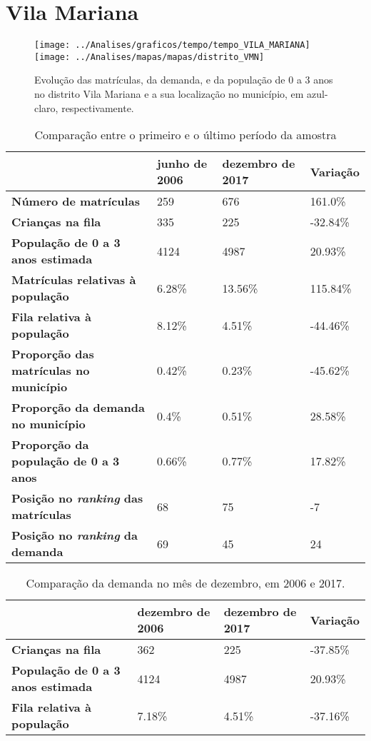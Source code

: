 \section{Vila Mariana}
\begin{figure}[H]
\centering
\texttt{[image: ../Analises/graficos/tempo/tempo\_VILA\_MARIANA]}
\texttt{[image: ../Analises/mapas/mapas/distrito\_VMN]}
\caption{Evolução das matrículas, da demanda, e da população de 0 a 3 anos no distrito Vila Mariana e a sua localização no município, em azul-claro, respectivamente.}
\end{figure}
\begin{table}[H]
\begin{tabular}{l|l|l|l}
\textbf{}                                      & \textbf{junho de 2006}       & \textbf{dezembro de 2017}    & \textbf{Variação} \\ \hline
\textbf{Número de matrículas}                  & 259 & 676 & 161.0\% \\ \hline
\textbf{Crianças na fila}                      & 335 & 225 & -32.84\% \\ \hline
\textbf{População de 0 a 3 anos estimada}      & 4124 & 4987 & 20.93\% \\ \hline
\textbf{Matrículas relativas à população}      & 6.28\% & 13.56\% & 115.84\% \\ \hline
\textbf{Fila relativa à população}             & 8.12\% & 4.51\% & -44.46\% \\ \hline
\textbf{Proporção das matrículas no município} & 0.42\% & 0.23\% & -45.62\% \\ \hline
\textbf{Proporção da demanda no município}     & 0.4\% & 0.51\% & 28.58\% \\ \hline
\textbf{Proporção da população de 0 a 3 anos}  & 0.66\% & 0.77\% & 17.82\% \\ \hline
\textbf{Posição no \textit{ranking} das matrículas}     & 68 & 75 & -7 \\ \hline
\textbf{Posição no \textit{ranking} da demanda}         & 69 & 45 & 24 \\ 
\end{tabular}
\caption{Comparação entre o primeiro e o último período da amostra}
\end{table}
\begin{table}[H]
\begin{tabular}{l|l|l|l}
\textbf{}                                 & \textbf{dezembro de 2006} & \textbf{dezembro de 2017} & \textbf{Variação} \\ \hline
\textbf{Crianças na fila}                      & 362 & 225 & -37.85\% \\ \hline
\textbf{População de 0 a 3 anos estimada}      & 4124 & 4987 & 20.93\% \\ \hline
\textbf{Fila relativa à população}             & 7.18\% & 4.51\% & -37.16\% \\
\end{tabular}
\caption{Comparação da demanda no mês de dezembro, em 2006 e 2017.}
\end{table}

